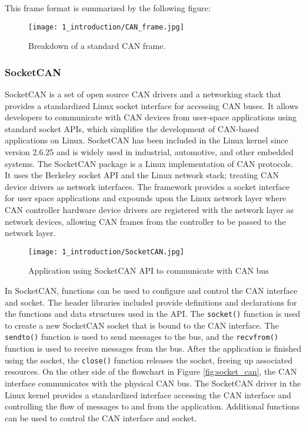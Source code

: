 This frame format is summarized by the following figure:

\begin{figure}[h!]
    \texttt{[image: 1\_introduction/CAN\_frame.jpg]}
    \caption[]{Breakdown of a standard CAN frame.}
\end{figure}

\subsubsection{SocketCAN}
SocketCAN is a set of open source CAN drivers and a networking stack that provides a standardized Linux socket interface for accessing CAN buses. 
It allows developers to communicate with CAN devices from user-space applications using standard socket APIs, which simplifies the development of CAN-based applications on Linux. 
SocketCAN has been included in the Linux kernel since version 2.6.25 and is widely used in industrial, automotive, and other embedded systems. 
The SocketCAN package is a Linux implementation of CAN protocols. 
It uses the Berkeley socket API and the Linux network stack; treating CAN device drivers as network interfaces. 
The framework provides a socket interface for user space applications and expounds upon the Linux network layer where CAN controller hardware device drivers are registered with the network layer as network devices, allowing CAN frames from the controller to be passed to the network layer. 

\begin{figure}[!h]
    \centering
    \texttt{[image: 1\_introduction/SocketCAN.jpg]}
    \caption{Application using SocketCAN API to communicate with CAN bus}
\end{figure}

In SocketCAN, functions can be used to configure and control the CAN interface and socket. 
The header libraries included provide definitions and declarations for the functions and data structures used in the API. 
The \lstinline{socket()} function is used to create a new SocketCAN socket that is bound to the CAN interface. 
The \lstinline{sendto()} function is used to send messages to the bus, and the \lstinline{recvfrom()} function is used to receive messages from the bus. 
After the application is finished using the socket, the \lstinline{close()} function releases the socket, freeing up associated resources. 
On the other side of the flowchart in Figure \ref{fig:socket_can}, the CAN interface communicates with the physical CAN bus.
The SocketCAN driver in the Linux kernel provides a standardized interface accessing the CAN interface and controlling the flow of messages to and from the application. 
Additional functions can be used to control the CAN interface and socket.

